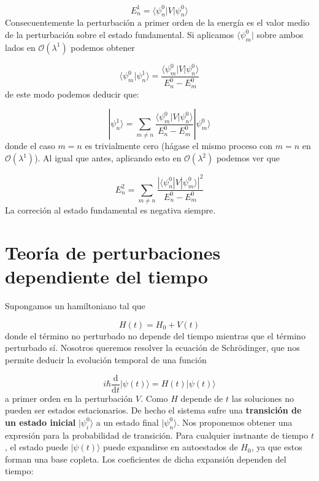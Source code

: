 \documentclass[12pt]{book}
\numberwithin{equation}{chapter}
\numberwithin{figure}{chapter}
\newcommand{\D}{\mathrm{d}}
\newcommand{\derivadas}[2]{\frac{\D #1}{\D #2}}
\begin{document}
\begin{equation}
E_n^1 = \langle \psi_n^0 | V | \psi_n^0 \rangle
\end{equation}
Consecuentemente la perturbación a primer orden de la energía es el valor medio de la perturbación sobre el estado fundamental. Si aplicamos $\langle \psi_m^0 |$ sobre ambos lados en $\mathcal{O} (\lambda^1)$ podemos obtener 

\begin{equation}
\langle \psi_m^0 | \psi_n^1 \rangle = \frac{\langle \psi_m^0 | V |\psi_n^0 \rangle}{E_n^0 - E_m^0}
\end{equation}
de este modo podemos deducir que:

\begin{equation}
|\psi^1_n \rangle = \sum_{m\neq n }  \frac{\langle \psi_m^0 | V |\psi_n^0 \rangle}{E_n^0 - E_m^0} | \psi_m^0 \rangle
\end{equation}
donde el caso $m=n$ es trivialmente cero (hágase el mismo proceso con $m=n$ en $\mathcal{O}(\lambda^1)$). Al igual que antes, aplicando esto en $\mathcal{O}(\lambda^2)$ podemos ver que

\begin{equation}
E_n^2 = \sum_{m\neq n} \frac{|\langle \psi_n^0 | V | \psi_m^0\rangle |^2}{E_n^0 - E_m^0}
\end{equation}
La correción al estado fundamental es negativa siempre.

\section{Teoría de perturbaciones dependiente del tiempo}

Supongamos un hamiltoniano tal que

\begin{equation}
H (t) = H_0 + V(t) 
\end{equation}
donde el término no perturbado no depende del tiempo mientras que el término perturbado sí. Nosotros queremos resolver la ecuación de Schrödinger, que nos permite deducir la evolución temporal de una función

\begin{equation}
i \hbar \derivadas{}{t} | \psi(t) \rangle = H (t) | \psi (t)\rangle
\end{equation}
a primer orden en la perturbación $V$. Como $H$ depende de $t$ las soluciones no pueden ser estados estacionarios. De hecho el sistema sufre una \textbf{transición de un estado inicial} $|\psi_i^0\rangle$ a un estado final $|\psi_n^0 \rangle$. Nos proponemos obtener una expresión para la probabilidad de transición. Para cualquier instnante de tiempo $t$, el estado puede $|\psi(t)\rangle$ puede expandirse en autoestados de $H_0$, ya que estos forman una base copleta. Los coeficientes de dicha expansión dependen del tiempo:
\end{document}
